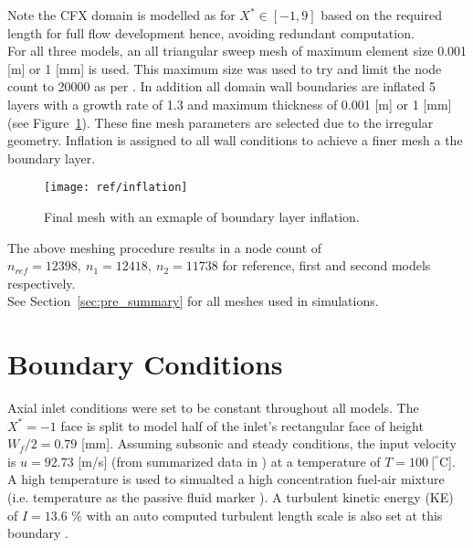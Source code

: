 Note the CFX domain is modelled as for $X^* \in [-1,9]$ based on the required length for full flow development \cite{art} hence, avoiding redundant computation.\\


For all three models, an all triangular sweep mesh of maximum element size 0.001 [m] or 1 [mm] is used. This maximum size was used to try and limit the node count to 20000 as per  \cite{proj}. In addition all domain wall boundaries are inflated 5 layers with a growth rate of 1.3 and maximum thickness of 0.001 [m] or 1 [mm] (see Figure~\ref{fig:inflation}). These fine mesh parameters are selected due to the irregular geometry. Inflation is assigned to all wall conditions to achieve a finer mesh a the boundary layer.

\begin{figure}[H]
	\centering
	\texttt{[image: ref/inflation]}
	\caption[Final mesh with an exmaple of boundary layer inflation.]{Final mesh with an exmaple of  boundary layer inflation.\cite{cfx}}
	\label{fig:inflation}
\end{figure}

The above meshing procedure results in a node count of $n_{ref}= 12398,\ n_1= 12418,\ n_2=11738$ for reference, first and second models respectively.\\

See Section~\ref{sec:pre_summary} for all meshes used in \cite{cfx} simulations.

\section{Boundary Conditions}
\label{sec:pre_bc}

Axial inlet conditions were set to be constant throughout all models. The $X^*=-1$ face is split to model half of the inlet's rectangular face of height $W_f/2=0.79$ [mm]. Assuming subsonic and steady conditions, the input velocity is $u=92.73$ [m/s] (from summarized \cite{art} data in \cite{projfaq}) at a temperature of $T=100\ [ ^{\circ}$C]. A high temperature is used to simualted a high concentration fuel-air mixture (i.e. temperature as the passive fluid marker \cite{proj}). A turbulent kinetic energy (KE) of $I=13.6$ \% with an auto computed turbulent length scale is also set at this boundary \cite{projfaq}.\\

